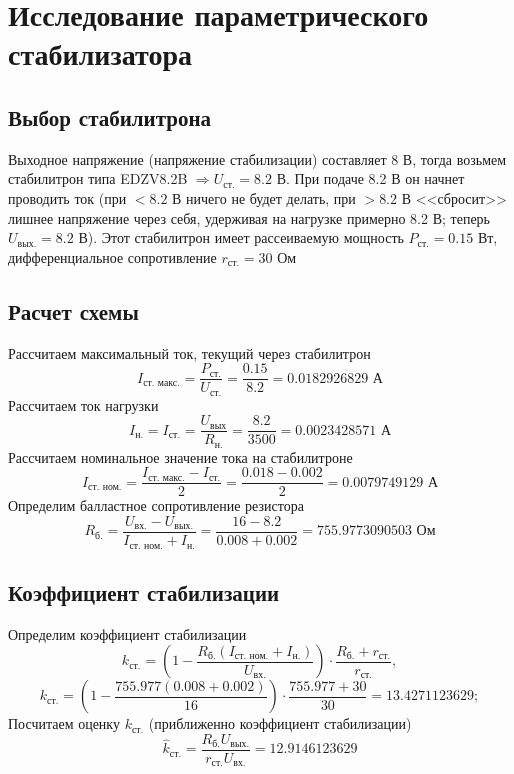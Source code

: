 \documentclass[a4paper, 12pt]{article}
\begin{document}
    \section{Исследование параметрического стабилизатора}
    \subsection{Выбор стабилитрона}
    Выходное напряжение (напряжение стабилизации) составляет 8 В, тогда возьмем стабилитрон типа EDZV8.2B $\Rightarrow U_{\text{ст.}}=8.2$ В.
    При подаче 8.2 В он начнет проводить ток (при $<8.2$ В ничего не будет делать, при $>8.2$ В <<сбросит>>
    лишнее напряжение через себя, удерживая на нагрузке примерно 8.2 В; теперь $U_{\text{вых.}}=8.2$ В). Этот стабилитрон имеет рассеиваемую
    мощность $P_\text{ст.}=0.15$ Вт, дифференциальное сопротивление $r_{\text{ст.}}=30$ Ом
    
    
    \subsection{Расчет схемы}
    Рассчитаем максимальный ток, текущий
    через стабилитрон
    $$
    I_{\text{ст. макс.}}=\dfrac{P_{\text{ст.}}}{U_{\text{ст.}}}=\dfrac{0.15}{8.2}=0.0182926829\text{ А}
    $$
    Рассчитаем ток нагрузки
    $$
    I_{\text{н.}}=I_{\text{ст.}}=\dfrac{U_{\text{вых}}}{R_{\text{н.}}}=\dfrac{8.2}{3500}=0.0023428571\text{ А}
    $$
    Рассчитаем номинальное значение тока на стабилитроне
    $$
    I_{\text{ст. ном.}}=\dfrac{I_{\text{ст. макс.}}-I_{\text{ст.}}}{2}=\dfrac{0.018-0.002}{2}=0.0079749129\text{ А}
    $$
    Определим балластное сопротивление резистора
    $$
    R_{\text{б.}}=\dfrac{U_{\text{вх.}}-U_{\text{вых.}}}{I_{\text{ст. ном.}}+I_{\text{н.}}}=\dfrac{16-8.2}{0.008+0.002}=755.9773090503\text{ Ом}
    $$


    \subsection{Коэффициент стабилизации}
    Определим коэффициент стабилизации
    $$
    k_{\text{ст.}}=\left( 1-\dfrac{R_{\text{б.}}\left( I_\text{ст. ном.}+I_{\text{н.}} \right)}{U_{\text{вх.}}} \right)\cdot\dfrac{R_{\text{б.}}+r_{\text{ст.}}}{r_{\text{ст.}}},
    $$
    $$
    k_{\text{ст.}}=\left( 1-\dfrac{755.977\left( 0.008+0.002 \right)}{16} \right)\cdot\dfrac{755.977+30}{30}=13.4271123629;
    $$
    Посчитаем оценку $k_{\text{ст.}}$ (приближенно коэффициент стабилизации)
    $$
    \hat{k}_{\text{ст.}}=\dfrac{R_{\text{б.}}U_{\text{вых.}}}{r_{\text{ст.}}U_{\text{вх.}}}=12.9146123629
    $$
\end{document}
